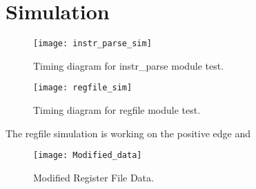 \documentclass{article}
\begin{document}
\section{Simulation}

\begin{figure}[h]	
	\caption{Timing diagram for instr\_parse module test.}
	\texttt{[image: instr\_parse\_sim]}

\end{figure}

\begin{figure}[h]	
	\caption{Timing diagram for regfile module test.}
	\texttt{[image: regfile\_sim]}
	\label{fig:fetchtest}
\end{figure}

The regfile simulation is working on the positive edge and 

\begin{figure}[h]	
	\caption{Modified Register File Data.}
	\texttt{[image: Modified\_data]}
	\label{fig:fetchtest}
\end{figure}
\end{document}
